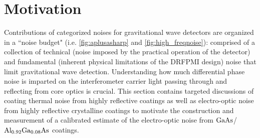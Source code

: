 


\section{Motivation}
Contributions of categorized noises for gravitational wave detectors are organized in a ``noise budget" (i.e. \autoref{fig:aplusasharp} and \autoref{fig:high_freqnoise}): comprised of a collection of technical (noise imposed by the practical operation of the detector) and fundamental (inherent physical limitations of the DRFPMI design) noise that limit gravitational wave detection. Understanding how much differential phase noise is imparted on the interferometer carrier light passing through and reflecting from core optics is crucial. This section contains targeted discussions of coating thermal noise from highly reflective coatings as well as electro-optic noise from highly reflective crystalline coatings to motivate the construction and measurement of a calibrated estimate of the electro-optic noise from $\mathrm{GaAs}$/$\mathrm{Al_{0.92}Ga_{0.08}As}$ coatings.

